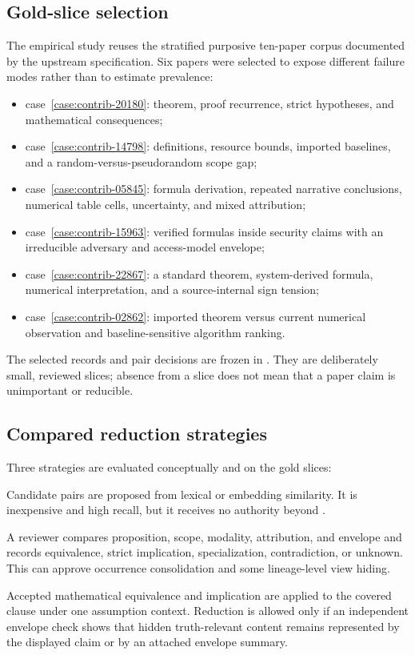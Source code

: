 \subsection{Gold-slice selection}

The empirical study reuses the stratified purposive ten-paper corpus documented by the upstream specification. Six papers were selected to expose different failure modes rather than to estimate prevalence:
\begin{itemize}
  \item case~\ref{case:contrib-20180}: theorem, proof recurrence, strict hypotheses, and mathematical consequences;
  \item case~\ref{case:contrib-14798}: definitions, resource bounds, imported baselines, and a random-versus-pseudorandom scope gap;
  \item case~\ref{case:contrib-05845}: formula derivation, repeated narrative conclusions, numerical table cells, uncertainty, and mixed attribution;
  \item case~\ref{case:contrib-15963}: verified formulas inside security claims with an irreducible adversary and access-model envelope;
  \item case~\ref{case:contrib-22867}: a standard theorem, system-derived formula, numerical interpretation, and a source-internal sign tension;
  \item case~\ref{case:contrib-02862}: imported theorem versus current numerical observation and baseline-sensitive algorithm ranking.
\end{itemize}
The selected records and pair decisions are frozen in . They are deliberately small, reviewed slices; absence from a slice does not mean that a paper claim is unimportant or reducible.

\subsection{Compared reduction strategies}

Three strategies are evaluated conceptually and on the gold slices:
\begin{description}[style=nextline]
  \item[Text similarity clustering.] Candidate pairs are proposed from lexical or embedding similarity. It is inexpensive and high recall, but it receives no authority beyond .
  \item[Source-aware semantic subsumption.] A reviewer compares proposition, scope, modality, attribution, and envelope and records equivalence, strict implication, specialization, contradiction, or unknown. This can approve occurrence consolidation and some lineage-level view hiding.
  \item[MathClaim-grounded quotient.] Accepted mathematical equivalence and implication are applied to the covered clause under one assumption context. Reduction is allowed only if an independent envelope check shows that hidden truth-relevant content remains represented by the displayed claim or by an attached envelope summary.
\end{description}

